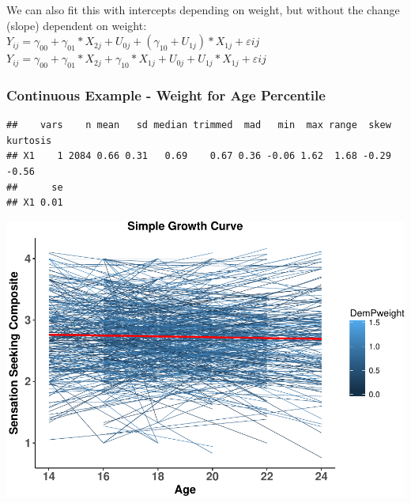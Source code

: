 \documentclass[]{article}
\newenvironment{Shaded}{\begin{snugshade}}{\end{snugshade}}
\newcommand{\KeywordTok}[1]{\textcolor[rgb]{0.13,0.29,0.53}{\textbf{{#1}}}}
\newcommand{\NormalTok}[1]{{#1}}
\begin{document}
We can also fit this with intercepts depending on weight, but without
the change (slope) dependent on weight:\\
\(Y_{ij} = \gamma_{00} + \gamma_{01}*X_{2j} + U_{0j} + (\gamma_{10} + U_{1j})*X_{1j} + \varepsilon{ij}\)
\(Y_{ij} = \gamma_{00} + \gamma_{01}*X_{2j} + \gamma_{10}*X_{1j} + U_{0j} + U_{1j}*X_{1j} + \varepsilon{ij}\)

\subsubsection{Continuous Example - Weight for Age
Percentile}\label{continuous-example---weight-for-age-percentile}

\small

\begin{Shaded}
\end{Shaded}

\begin{verbatim}
##    vars    n mean   sd median trimmed  mad   min  max range  skew kurtosis
## X1    1 2084 0.66 0.31   0.69    0.67 0.36 -0.06 1.62  1.68 -0.29    -0.56
##      se
## X1 0.01
\end{verbatim}

\normalsize

\includegraphics{Conditional_Models_doc_files/figure-latex/unnamed-chunk-7-1.pdf}

\small
\end{document}
